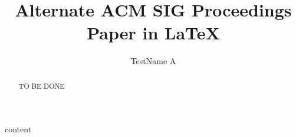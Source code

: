 \documentclass{sig-alternate}
\begin{document}



\title{Alternate {\ttlit ACM} SIG Proceedings Paper in LaTeX}
\author{
\alignauthor
TestName A
}

\maketitle
\begin{abstract}
TO BE DONE
\end{abstract}
\printccsdesc

%
%
{content}
\end{document}
